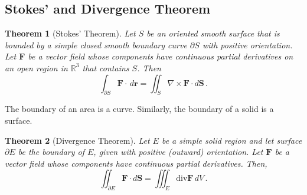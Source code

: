 \documentclass[
]{article}
\newtheorem{theorem}{Theorem}[section]
\theoremstyle{definition}
\theoremstyle{definition}
\theoremstyle{definition}
\theoremstyle{definition}
\theoremstyle{remark}
\begin{document}
\subsection{Stokes' and Divergence Theorem}\label{stokes-and-divergence-theorem}

\begin{theorem}[Stokes' Theorem]
Let \(S\) be an oriented smooth surface that is bounded by a simple closed
smooth boundary curve \(\partial S\) with positive orientation.
Let \(\mathbf{F}\) be a vector field whose components have continuous partial
derivatives on an open region in \(\mathbb{R}^3\) that contains \(S\).
Then
\begin{equation*}
    \int_{\partial S} \mathbf{F} \cdot \, d\mathbf{r} = \iint_S \nabla \times \mathbf{F} \cdot d\mathbf{S} \,.
\end{equation*}
\end{theorem}

The boundary of an area is a curve.
Similarly, the boundary of a solid is a surface.

\begin{theorem}[Divergence Theorem]
Let \(E\) be a simple solid region and let surface \(\partial E\) be the boundary of \(E\),
given with positive (outward) orientation.
Let \(\mathbf{F}\) be a vector field whose components have continuous partial derivatives.
Then,
\begin{equation*}
    \iint_{\partial E} \mathbf{F} \cdot d\mathbf{S} = \iiint_E \mathrm{div} \mathbf{F} \, dV \,.
\end{equation*}
\end{theorem}
\end{document}
